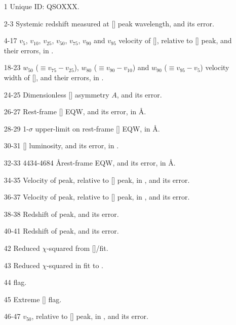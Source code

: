 \begin{itemize}

    
  \item[1] Unique ID: QSOXXX.

  \item[2-3] Systemic redshift measured at [] peak wavelength, and its error. 

  \item[4-17] $v_{5}$, $v_{10}$, $v_{25}$, $v_{50}$, $v_{75}$, $v_{90}$ and $v_{95}$ velocity of [], relative to [] peak, and their errors, in \kms.  

  \item[18-23] $w_{50}$ ($\equiv v_{75} - v_{25}$), $w_{80}$ ($\equiv v_{90} - v_{10}$) and $w_{90}$ ($\equiv v_{95} - v_{5}$) velocity width of [], and their errors, in \kms.

  \item[24-25] Dimensionless [] asymmetry $A$, and its error.

  \item[26-27] Rest-frame [] EQW, and its error, in \AA.

  \item[28-29] 1-$\sigma$ upper-limit on rest-frame [] EQW, in \AA. %

  \item[30-31] [\ion{O}{III}] luminosity, and its error, in \ergs. 

  \item[32-33] 4434-4684 \AA rest-frame  EQW, and its error, in \AA. %

  \item[34-35] Velocity of \hb peak, relative to [] peak, in \kms, and its error. 

  \item[36-37] Velocity of \ha peak, relative to [] peak, in \kms, and its error. 

  \item[38-38] Redshift of \hb peak, and its error.

  \item[40-41] Redshift of \ha peak, and its error.

  \item[42] Reduced $\chi$-squared from []/\hb fit. 

  \item[43] Reduced $\chi$-squared in fit to \ha. 

  \item[44]  flag. 

  \item[45] Extreme [] flag.   

  \item[46-47]  $v_{50}$, relative to [] peak, in \kms, and its error.

\end{itemize}

